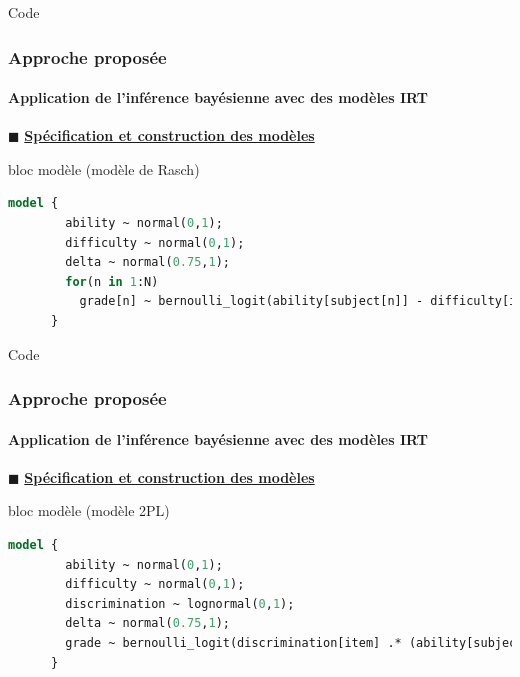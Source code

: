 \documentclass[aspectratio=169,professionalfonts, 12pt]{beamer}
\begin{document}
\begin{frame}[fragile]{Code}
  \frametitle{Approche proposée}
  \framesubtitle{Application de l'inférence bayésienne avec des modèles IRT}
  \justifying 
  \(\displaystyle \blacksquare \) \textbf{\underline{Spécification et construction des modèles}}
  \begin{minipage}{\textwidth}
  \begin{block}{bloc modèle (modèle de Rasch)}
    \begin{lstlisting}[language=Stan,basicstyle=\scriptsize,framesep=4.5mm,framexleftmargin=2.5mm,tabsize=2]
      model {
        ability ~ normal(0,1);         
        difficulty ~ normal(0,1);   
        delta ~ normal(0.75,1);
        for(n in 1:N)
          grade[n] ~ bernoulli_logit(ability[subject[n]] - difficulty[item[n]] + delta);
      }
    \end{lstlisting}
  \end{block}
  \end{minipage}
\end{frame}
\begin{frame}[fragile]{Code}
  \frametitle{Approche proposée}
  \framesubtitle{Application de l'inférence bayésienne avec des modèles IRT}
  \justifying 
  \(\displaystyle \blacksquare \) \textbf{\underline{Spécification et construction des modèles}}
  \begin{minipage}{\textwidth}
  \begin{block}{bloc modèle (modèle 2PL)}
    \begin{lstlisting}[language=Stan,basicstyle=\scriptsize,framesep=4.5mm,framexleftmargin=2.5mm,tabsize=2]
      model {
        ability ~ normal(0,1);         
        difficulty ~ normal(0,1);   
        discrimination ~ lognormal(0,1);
        delta ~ normal(0.75,1);
        grade ~ bernoulli_logit(discrimination[item] .* (ability[subject] - (difficulty[item] + delta)));	
      }
    \end{lstlisting}
  \end{block}
  \end{minipage}
\end{frame}
\end{document}
